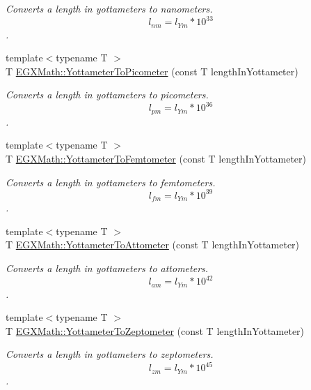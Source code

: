 \begin{DoxyCompactItemize}
\begin{DoxyCompactList}\small\item\em Converts a length in yottameters to nanometers. \[ l_{nm}=l_{Ym} * 10^{33} \]. \end{DoxyCompactList}\item 
{\footnotesize template$<$typename T $>$ }\\T \mbox{\hyperlink{group___e_g_x_math-_conversions-_length_conversions-_s_i-_yottameter-_s_i_ga7af9d1314de06921546f079641c033b2}{E\+G\+X\+Math\+::\+Yottameter\+To\+Picometer}} (const T length\+In\+Yottameter)
\begin{DoxyCompactList}\small\item\em Converts a length in yottameters to picometers. \[ l_{pm}=l_{Ym} * 10^{36} \]. \end{DoxyCompactList}\item 
{\footnotesize template$<$typename T $>$ }\\T \mbox{\hyperlink{group___e_g_x_math-_conversions-_length_conversions-_s_i-_yottameter-_s_i_ga02dbecce4d520a89139e6de0e2fec6d9}{E\+G\+X\+Math\+::\+Yottameter\+To\+Femtometer}} (const T length\+In\+Yottameter)
\begin{DoxyCompactList}\small\item\em Converts a length in yottameters to femtometers. \[ l_{fm}=l_{Ym} * 10^{39} \]. \end{DoxyCompactList}\item 
{\footnotesize template$<$typename T $>$ }\\T \mbox{\hyperlink{group___e_g_x_math-_conversions-_length_conversions-_s_i-_yottameter-_s_i_gad04f66f8ca146161e2a36525bb887a5b}{E\+G\+X\+Math\+::\+Yottameter\+To\+Attometer}} (const T length\+In\+Yottameter)
\begin{DoxyCompactList}\small\item\em Converts a length in yottameters to attometers. \[ l_{am}=l_{Ym} * 10^{42} \]. \end{DoxyCompactList}\item 
{\footnotesize template$<$typename T $>$ }\\T \mbox{\hyperlink{group___e_g_x_math-_conversions-_length_conversions-_s_i-_yottameter-_s_i_ga976c591d436c20684f2d55461a05da3e}{E\+G\+X\+Math\+::\+Yottameter\+To\+Zeptometer}} (const T length\+In\+Yottameter)
\begin{DoxyCompactList}\small\item\em Converts a length in yottameters to zeptometers. \[ l_{zm}=l_{Ym} * 10^{45} \]. \end{DoxyCompactList}\item 

\end{DoxyCompactItemize}
